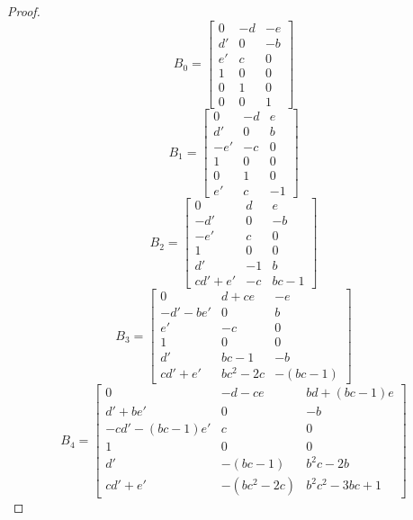 \documentclass{amsart}
\numberwithin{theorem}{section}
\begin{document}
  \begin{proof}
    \[B_0=\left[\begin{array}{ccc} 0 & -d & -e \\ d' & 0 & -b\\ e' & c & 0\\ 1 & 0 & 0\\ 0 & 1 & 0\\ 0 & 0 & 1\end{array}\right]\]
    \[B_1=\left[\begin{array}{ccc} 0 & -d & e \\ d' & 0 & b\\ -e' & -c & 0\\ 1 & 0 & 0\\ 0 & 1 & 0\\ e' & c & -1\end{array}\right]\]
    \[B_2=\left[\begin{array}{ccc} 0 & d & e \\ -d' & 0 & -b\\ -e' & c & 0\\ 1 & 0 & 0\\ d' & -1 & b\\ cd'+e' & -c & bc-1\end{array}\right]\]
    \[B_3=\left[\begin{array}{ccc} 0 & d+ce & -e \\ -d'-be' & 0 & b\\ e' & -c & 0\\ 1 & 0 & 0\\ d' & bc-1 & -b\\ cd'+e' & bc^2-2c & -(bc-1)\end{array}\right]\]
    \[B_4=\left[\begin{array}{ccc} 0 & -d-ce & bd+(bc-1)e \\ d'+be' & 0 & -b\\ -cd'-(bc-1)e' & c & 0\\ 1 & 0 & 0\\ d' & -(bc-1) & b^2c-2b\\ cd'+e' & -(bc^2-2c) & b^2c^2-3bc+1\end{array}\right]\]


\end{proof}
\end{document}
